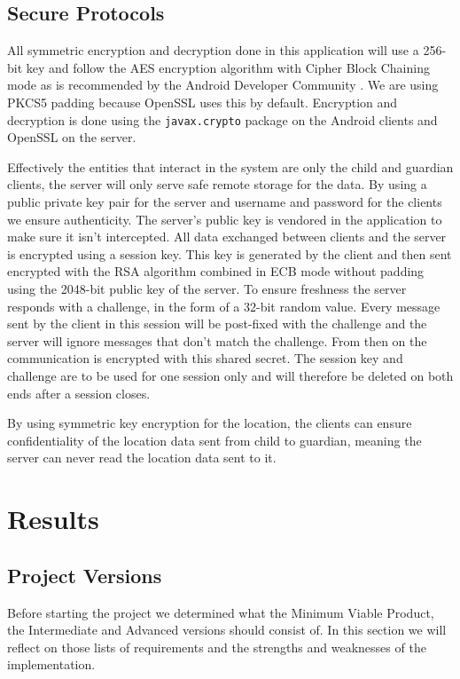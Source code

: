 \documentclass[a4paper]{article}
\begin{document}
\subsection{Secure Protocols}
All symmetric encryption and decryption done in this application will use a 256-bit key and follow the AES encryption algorithm with Cipher Block Chaining mode as is recommended by the Android Developer Community \cite{cipher_recommendation}. We are using PKCS5 padding because OpenSSL \cite{openssl} uses this by default. Encryption and decryption is done using the \texttt{javax.crypto} package on the Android clients and OpenSSL on the server. 

Effectively the entities that interact in the system are only the child and guardian clients, the server will only serve safe remote storage for the data. By using a public private key pair for the server and username and password for the clients we ensure authenticity. The server's public key is vendored in the application to make sure it isn't intercepted. All data exchanged between clients and the server is encrypted using a session key. This key is generated by the client and then sent encrypted with the RSA algorithm combined in ECB mode without padding using the 2048-bit public key of the server. To ensure freshness the server responds with a challenge, in the form of a 32-bit random value. Every message sent by the client in this session will be post-fixed with the challenge and the server will ignore messages that don't match the challenge. From then on the communication is encrypted with this shared secret. The session key and challenge are to be used for one session only and will therefore be deleted on both ends after a session closes. 

By using symmetric key encryption for the location, the clients can ensure confidentiality of the location data sent from child to guardian, meaning the server can never read the location data sent to it. 

\section{Results}
\subsection{Project Versions}
Before starting the project we determined what the Minimum Viable Product, the Intermediate and Advanced versions should consist of. In this section we will reflect on those lists of requirements and the strengths and weaknesses of the implementation. 
\end{document}
